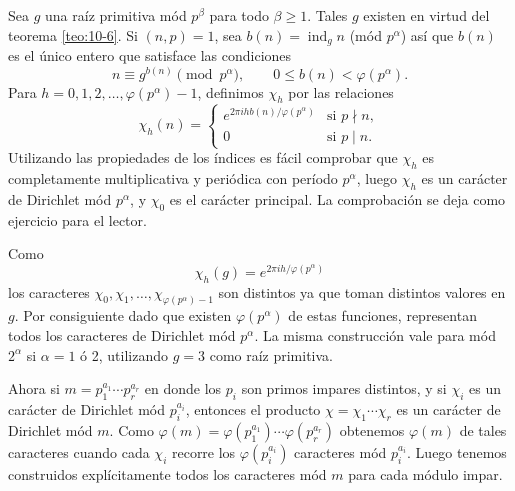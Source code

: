 \documentclass[12pt,a4paper]{book}
\begin{document}
    Sea $g$ una raíz primitiva mód $p^{\beta}$ para todo $\beta\geq1$. Tales $g$ existen en
    virtud del teorema \ref{teo:10-6}. Si $(n,p)=1$, sea $b(n)=\operatorname{ind}_{g}n$ (mód
    $p^{\alpha}$) así que $b(n)$ es el único entero que satisface las condiciones
    \begin{equation*}
        n\equiv g^{b(n)}\pmod{p^{\alpha}},\qquad0\leq b(n)<\varphi(p^{\alpha}).
    \end{equation*}
    Para $h=0,1,2,\dots,\varphi(p^{\alpha})-1$, definimos $\chi_{h}$ por las relaciones
    \begin{equation}\label{eq:10-21}
        \chi_{h}(n)=
        \begin{cases}
            e^{2\pi ihb(n)/\varphi(p^{\alpha})}&\text{si }p\nmid n,\\
            0&\text{si }p\mid n.
        \end{cases}
    \end{equation}
    Utilizando las propiedades de los índices es fácil comprobar que $\chi_{h}$ es
    completamente multiplicativa y periódica con período $p^{\alpha}$, luego $\chi_{h}$ es un
    carácter de Dirichlet mód $p^{\alpha}$, y $\chi_{0}$ es el carácter principal. La
    comprobación se deja como ejercicio para el lector.

    Como
    \begin{equation*}
        \chi_{h}(g)=e^{2\pi ih/\varphi(p^{\alpha})}
    \end{equation*}
    los caracteres $\chi_{0},\chi_{1},\dots,\chi_{\varphi(p^{\alpha})-1}$ son distintos ya que
    toman distintos valores en $g$. Por consiguiente dado que existen $\varphi(p^{\alpha})$
    de estas funciones, representan todos los caracteres de Dirichlet mód $p^{\alpha}$. La
    misma construcción vale para mód $2^{\alpha}$ si $\alpha=1$ ó 2, utilizando $g=3$ como
    raíz primitiva.

    Ahora si $m=p_{1}^{a_{1}}\cdots p_{r}^{a_{r}}$ en donde los $p_{i}$ son primos impares distintos, y
    si $\chi_{i}$ es un carácter de Dirichlet mód $p_{i}^{a_{i}}$, entonces el producto
    $\chi=\chi_{1}\cdots\chi_{r}$ es un carácter de Dirichlet mód $m$. Como
    $\varphi(m)=\varphi(p_{1}^{a_{1}})\cdots\varphi(p_{r}^{a_{r}})$ obtenemos $\varphi(m)$ de tales
    caracteres cuando cada $\chi_{i}$ recorre los $\varphi(p_{i}^{a_{i}})$ caracteres mód
    $p_{i}^{a_{i}}$. Luego tenemos construidos explícitamente todos los caracteres mód $m$ para
    cada módulo impar.
\end{document}
